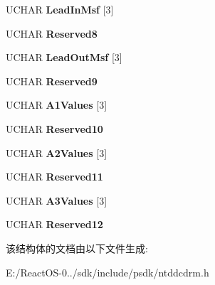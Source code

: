 \begin{DoxyCompactItemize}
U\+C\+H\+AR {\bfseries Lead\+In\+Msf} \mbox{[}3\mbox{]}
\item 
\mbox{\label{struct___c_d_r_o_m___t_o_c___a_t_i_p___d_a_t_a___b_l_o_c_k_af8b61489d2e8a8251d1ddf2afd200a23}} 
U\+C\+H\+AR {\bfseries Reserved8}
\item 
\mbox{\label{struct___c_d_r_o_m___t_o_c___a_t_i_p___d_a_t_a___b_l_o_c_k_afc3ab5359833aa4da91a2fb7517f9501}} 
U\+C\+H\+AR {\bfseries Lead\+Out\+Msf} \mbox{[}3\mbox{]}
\item 
\mbox{\label{struct___c_d_r_o_m___t_o_c___a_t_i_p___d_a_t_a___b_l_o_c_k_ae93d96365691d2542c5fa29427c7a635}} 
U\+C\+H\+AR {\bfseries Reserved9}
\item 
\mbox{\label{struct___c_d_r_o_m___t_o_c___a_t_i_p___d_a_t_a___b_l_o_c_k_aa34c72e7b4a75fd77d16b43ecabb54b2}} 
U\+C\+H\+AR {\bfseries A1\+Values} \mbox{[}3\mbox{]}
\item 
\mbox{\label{struct___c_d_r_o_m___t_o_c___a_t_i_p___d_a_t_a___b_l_o_c_k_a80316c869036d1a6f503535b88a15bcc}} 
U\+C\+H\+AR {\bfseries Reserved10}
\item 
\mbox{\label{struct___c_d_r_o_m___t_o_c___a_t_i_p___d_a_t_a___b_l_o_c_k_ae3ebeb1d9c3ab477dbc9b7e5c08cd103}} 
U\+C\+H\+AR {\bfseries A2\+Values} \mbox{[}3\mbox{]}
\item 
\mbox{\label{struct___c_d_r_o_m___t_o_c___a_t_i_p___d_a_t_a___b_l_o_c_k_a4b6ecf211f3d2f938ec54bf0c05aca53}} 
U\+C\+H\+AR {\bfseries Reserved11}
\item 
\mbox{\label{struct___c_d_r_o_m___t_o_c___a_t_i_p___d_a_t_a___b_l_o_c_k_aa83e622a9889f7867c4f623cb4b702f3}} 
U\+C\+H\+AR {\bfseries A3\+Values} \mbox{[}3\mbox{]}
\item 
\mbox{\label{struct___c_d_r_o_m___t_o_c___a_t_i_p___d_a_t_a___b_l_o_c_k_ae283d42a2c9dcb574172463f911488b7}} 
U\+C\+H\+AR {\bfseries Reserved12}
\end{DoxyCompactItemize}


该结构体的文档由以下文件生成\+:\begin{DoxyCompactItemize}
\item 
E\+:/\+React\+O\+S-\/0../sdk/include/psdk/ntddcdrm.\+h\end{DoxyCompactItemize}
